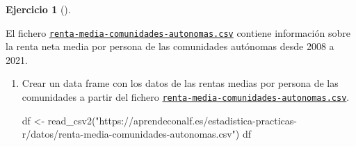 \documentclass[
  a4paper,
]{scrreport}
\newenvironment{Shaded}{\begin{snugshade}}{\end{snugshade}}
\newcommand{\FunctionTok}[1]{\textcolor[rgb]{0.28,0.35,0.67}{#1}}
\newcommand{\NormalTok}[1]{\textcolor[rgb]{0.00,0.23,0.31}{#1}}
\newcommand{\OtherTok}[1]{\textcolor[rgb]{0.00,0.23,0.31}{#1}}
\newcommand{\StringTok}[1]{\textcolor[rgb]{0.13,0.47,0.30}{#1}}
\theoremstyle{definition}
\newtheorem{exercise}{Ejercicio}[chapter]
\theoremstyle{remark}
\begin{document}
\begin{exercise}[]\protect\hypertarget{exr-descriptiva-3}{}\label{exr-descriptiva-3}

El fichero
\href{datos/renta-media-comunidades-autonomas.csv}{\texttt{renta-media-comunidades-autonomas.csv}}
contiene información sobre la renta neta media por persona de las
comunidades autónomas desde 2008 a 2021.

\begin{enumerate}
\def\labelenumi{\alph{enumi}.}
\item
  Crear un data frame con los datos de las rentas medias por persona de
  las comunidades a partir del fichero
  \href{datos/renta-media-comunidades-autonomas.csv}{\texttt{renta-media-comunidades-autonomas.csv}}.

  \begin{tcolorbox}[enhanced jigsaw, breakable, toptitle=1mm, colbacktitle=quarto-callout-tip-color!10!white, rightrule=.15mm, opacityback=0, opacitybacktitle=0.6, titlerule=0mm, coltitle=black, colframe=quarto-callout-tip-color-frame, colback=white, bottomtitle=1mm, leftrule=.75mm, toprule=.15mm, title=\textcolor{quarto-callout-tip-color}{\faLightbulb}\hspace{0.5em}{Solución}, arc=.35mm, bottomrule=.15mm, left=2mm]

\begin{Shaded}
\begin{Highlighting}[]
\NormalTok{df }\OtherTok{\textless{}{-}} \FunctionTok{read\_csv2}\NormalTok{(}\StringTok{"https://aprendeconalf.es/estadistica{-}practicas{-}r/datos/renta{-}media{-}comunidades{-}autonomas.csv"}\NormalTok{)}
\NormalTok{df}
\end{Highlighting}
\end{Shaded}


\end{tcolorbox}
\end{enumerate}
\end{exercise}
\end{document}
